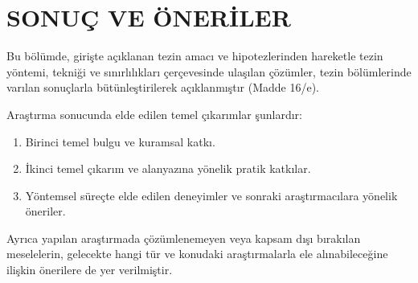 \chapter*{SONUÇ VE ÖNERİLER}

Bu bölümde, girişte açıklanan tezin amacı ve hipotezlerinden hareketle tezin yöntemi, tekniği ve sınırlılıkları çerçevesinde ulaşılan çözümler, tezin bölümlerinde varılan sonuçlarla bütünleştirilerek açıklanmıştır (Madde 16/e).

Araştırma sonucunda elde edilen temel çıkarımlar şunlardır:
\begin{enumerate}
    \item Birinci temel bulgu ve kuramsal katkı.
    \item İkinci temel çıkarım ve alanyazına yönelik pratik katkılar.
    \item Yöntemsel süreçte elde edilen deneyimler ve sonraki araştırmacılara yönelik öneriler.
\end{enumerate}

Ayrıca yapılan araştırmada çözümlenemeyen veya kapsam dışı bırakılan meselelerin, gelecekte hangi tür ve konudaki araştırmalarla ele alınabileceğine ilişkin önerilere de yer verilmiştir.